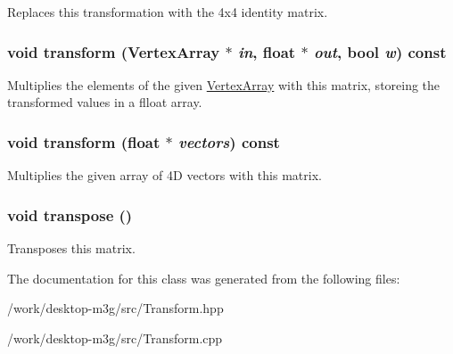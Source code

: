 Replaces this transformation with the 4x4 identity matrix. \hypertarget{classm3g_1_1Transform_557e326db393b8a1ce23455978af32dc}{
\subsubsection[{transform}]{\setlength{\rightskip}{0pt plus 5cm}void transform ({\bf VertexArray} $\ast$ {\em in}, \/  float $\ast$ {\em out}, \/  bool {\em w}) const}}
\label{classm3g_1_1Transform_557e326db393b8a1ce23455978af32dc}


Multiplies the elements of the given \hyperlink{classm3g_1_1VertexArray}{VertexArray} with this matrix, storeing the transformed values in a flloat array. \hypertarget{classm3g_1_1Transform_0b85978885624f651df63da4137692df}{
\subsubsection[{transform}]{\setlength{\rightskip}{0pt plus 5cm}void transform (float $\ast$ {\em vectors}) const}}
\label{classm3g_1_1Transform_0b85978885624f651df63da4137692df}


Multiplies the given array of 4D vectors with this matrix. \hypertarget{classm3g_1_1Transform_f3a99ffb20127be48232d12260e934dc}{
\subsubsection[{transpose}]{\setlength{\rightskip}{0pt plus 5cm}void transpose ()}}
\label{classm3g_1_1Transform_f3a99ffb20127be48232d12260e934dc}


Transposes this matrix. 

The documentation for this class was generated from the following files:\begin{CompactItemize}
\item 
/work/desktop-m3g/src/Transform.hpp\item 
/work/desktop-m3g/src/Transform.cpp\end{CompactItemize}
